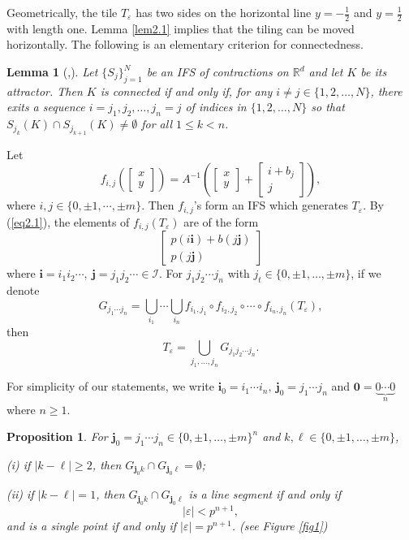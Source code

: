 \documentclass[12pt, reqno]{amsart}
\newtheorem{Prop}[theorem]{Proposition}
\newtheorem{Lem}[theorem]{Lemma}
\numberwithin{equation}{section}
\begin{document}
Geometrically, the tile $T_\varepsilon$ has two sides on the horizontal line $y=-\frac{1}{2}$ and $y=\frac{1}{2}$ with length one. Lemma \ref{lem2.1} implies that the tiling can be moved horizontally. The following is an elementary criterion for connectedness.

\begin{Lem}[\cite{Ha},\cite{KiLa}]\label{lem2.2}
Let $\{S_j\}^N_{j=1}$ be an IFS of contractions on $\mathbb{R}^d$ and let $K$ be its attractor. Then $K$ is connected if and only if, for any $i\neq j\in\{1,2,\dots,N\}$, there exits a sequence $i=j_1,j_2,\dots,j_n=j$ of indices in $\{1,2,\dots,N\}$ so that $S_{j_k}(K)\cap S_{j_{k+1}}(K)\neq\emptyset$ for all $1\leq k<n$.
\end{Lem}

Let $$f_{i,j}\left(\left[\begin{array}{c}
x\\
y
\end{array}\right]\right)=A^{-1}\left(\left[\begin{array}{c}
x\\
y
\end{array}\right]+\left[\begin{array}{c}
i+b_j\\
j
\end{array}\right]\right),$$ where $ i,j\in\{0,\pm1,\cdots,\pm m\}.$  Then $f_{i,j}$'s form an IFS which generates $T_\varepsilon$. By (\ref{eq2.1}), the elements of $f_{i,j}(T_\varepsilon)$ are of the form
\begin{equation}\label{eq2.2}
\left[\begin{array}{c}
p(i{\mathbf i})+b(j{\mathbf j})\\
p(j{\mathbf j})
\end{array}\right]
\end{equation} where ${\mathbf i}=i_1i_2\cdots,\ {\mathbf j}=j_1j_2\cdots\in {\mathcal I}$. For $j_1j_2\cdots j_n$ with $j_t\in \{0,\pm1,\dots, \pm m\}$,  if we denote
\begin{equation}\label{eq2.3}
G_{j_1\cdots j_n}=\bigcup_{i_1}\cdots\bigcup_{i_n}f_{i_1,j_1}\circ f_{i_2, j_2}\circ\cdots \circ f_{i_n, j_n}(T_\varepsilon),
\end{equation}
then $$T_\varepsilon=\bigcup_{j_1,\dots, j_n}G_{j_1j_2\cdots j_n}.$$

For simplicity of our statements, we write ${\mathbf i}_0=i_1\cdots i_n,\ {\mathbf j}_0=j_1\cdots j_n$ and ${\mathbf 0}=\underbrace{0\cdots 0}_n$ where $n\geq 1$.

\begin{Prop}\label{prop1}
For ${\mathbf j}_0=j_1\cdots j_n\in \{0,\pm1,\dots,\pm m\}^n$ and $k,\ell\in\{0,\pm1,\dots,\pm m\}$,

(i) if $|k-\ell| \geq 2$, then $G_{{\mathbf j}_0 k}\cap G_{{\mathbf j}_0\ell}=\emptyset$;

(ii) if $|k-\ell|=1$, then $G_{{\mathbf j}_0 k}\cap G_{{\mathbf j}_0\ell}$ is a line segment if and only if $$|\varepsilon|<p^{n+1},$$ and is a single point if and only if $|\varepsilon|=p^{n+1}$. (see Figure \ref{fig1})
\end{Prop}
\end{document}
